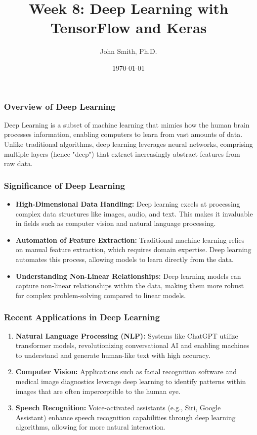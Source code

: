 \documentclass[aspectratio=169]{beamer}
\title[Week 8: Deep Learning]{Week 8: Deep Learning with TensorFlow and Keras}
\author[J. Smith]{John Smith, Ph.D.}
\institute[University Name]{
  Department of Computer Science\\
  University Name\\
  \vspace{0.3cm}
  Email: email@university.edu\\
  Website: www.university.edu
}
\date{\today}
\begin{document}
\frame{\titlepage}

\begin{frame}[fragile]
    \titlepage
\end{frame}

\begin{frame}[fragile]
    \frametitle{Overview of Deep Learning}
    Deep Learning is a subset of machine learning that mimics how the human brain processes information, enabling computers to learn from vast amounts of data. Unlike traditional algorithms, deep learning leverages neural networks, comprising multiple layers (hence "deep") that extract increasingly abstract features from raw data.
\end{frame}

\begin{frame}[fragile]
    \frametitle{Significance of Deep Learning}
    
    \begin{itemize}
        \item \textbf{High-Dimensional Data Handling:} 
        Deep learning excels at processing complex data structures like images, audio, and text. This makes it invaluable in fields such as computer vision and natural language processing.
        
        \item \textbf{Automation of Feature Extraction:}
        Traditional machine learning relies on manual feature extraction, which requires domain expertise. Deep learning automates this process, allowing models to learn directly from the data.
        
        \item \textbf{Understanding Non-Linear Relationships:}
        Deep learning models can capture non-linear relationships within the data, making them more robust for complex problem-solving compared to linear models.
    \end{itemize}
\end{frame}

\begin{frame}[fragile]
    \frametitle{Recent Applications in Deep Learning}

    \begin{enumerate}
        \item \textbf{Natural Language Processing (NLP):} 
        Systems like ChatGPT utilize transformer models, revolutionizing conversational AI and enabling machines to understand and generate human-like text with high accuracy.
        
        \item \textbf{Computer Vision:} 
        Applications such as facial recognition software and medical image diagnostics leverage deep learning to identify patterns within images that are often imperceptible to the human eye.
        
        \item \textbf{Speech Recognition:} 
        Voice-activated assistants (e.g., Siri, Google Assistant) enhance speech recognition capabilities through deep learning algorithms, allowing for more natural interaction.
    \end{enumerate}
\end{frame}
\end{document}
